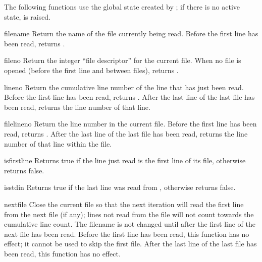 The following functions use the global state created by
; if there is no active state,
 is raised.

\begin{funcdesc}{filename}{}
  Return the name of the file currently being read.  Before the first
  line has been read, returns .
\end{funcdesc}

\begin{funcdesc}{fileno}{}
  Return the integer ``file descriptor'' for the current file. When no
  file is opened (before the first line and between files), returns
  .
\end{funcdesc}

\begin{funcdesc}{lineno}{}
  Return the cumulative line number of the line that has just been
  read.  Before the first line has been read, returns .  After
  the last line of the last file has been read, returns the line
  number of that line.
\end{funcdesc}

\begin{funcdesc}{filelineno}{}
  Return the line number in the current file.  Before the first line
  has been read, returns .  After the last line of the last
  file has been read, returns the line number of that line within the
  file.
\end{funcdesc}

\begin{funcdesc}{isfirstline}{}
  Returns true if the line just read is the first line of its file,
  otherwise returns false.
\end{funcdesc}

\begin{funcdesc}{isstdin}{}
  Returns true if the last line was read from ,
  otherwise returns false.
\end{funcdesc}

\begin{funcdesc}{nextfile}{}
  Close the current file so that the next iteration will read the
  first line from the next file (if any); lines not read from the file
  will not count towards the cumulative line count.  The filename is
  not changed until after the first line of the next file has been
  read.  Before the first line has been read, this function has no
  effect; it cannot be used to skip the first file.  After the last
  line of the last file has been read, this function has no effect.
\end{funcdesc}

